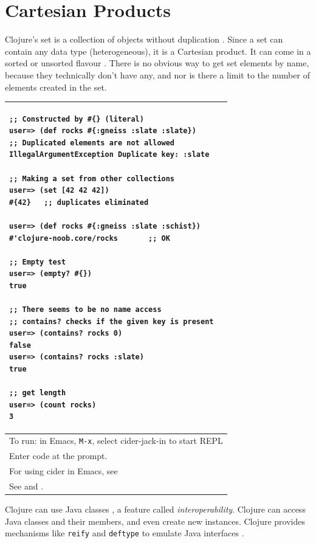 \documentclass[12pt]{article}
\begin{document}
\part{Cartesian Products}




Clojure's set is a collection of objects without duplication \cite{rathore2011clojure}. Since a set can contain any data type (heterogeneous), it is a Cartesian product. It can come in a sorted or unsorted flavour \cite{rathore2011clojure}. There is no obvious way to get set elements by name, because they technically don't have any, and nor is there a limit to the number of elements created in the set.


\begin{tabular}{|p{}|}
\hline
\begin{verbatim}
;; Constructed by #{} (literal)
user=> (def rocks #{:gneiss :slate :slate})
;; Duplicated elements are not allowed
IllegalArgumentException Duplicate key: :slate

;; Making a set from other collections
user=> (set [42 42 42])
#{42}   ;; duplicates eliminated 

user=> (def rocks #{:gneiss :slate :schist})
#'clojure-noob.core/rocks       ;; OK

;; Empty test
user=> (empty? #{})
true

;; There seems to be no name access 
;; contains? checks if the given key is present
user=> (contains? rocks 0)
false
user=> (contains? rocks :slate)
true

;; get length
user=> (count rocks)
3
\end{verbatim}
\\
\hline
To run: in Emacs, \texttt{M-x}, select cider-jack-in to start REPL\\
Enter code at the prompt.\\
For using cider in Emacs, see \cite{brave2015}\\
\hline
See \cite{rathore2011clojure} and \cite{empty}.\\
\hline
\end{tabular}




Clojure can use Java classes \cite{fogus2014joy}, a feature called {\it interoperability}. Clojure can access Java classes and their members, and even create new instances. Clojure provides mechanisms like \texttt{reify} and \texttt{deftype} to emulate Java interfaces \cite{fogus2014joy}.
\end{document}
